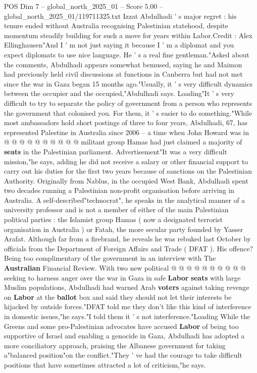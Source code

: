 \begin{textsample}{POS Dim 7 – global\_north\_2025\_01 – Score 5.00 – global\_north\_2025\_01/119711325.txt}  \label{ex:f7_pos_274}
Izzat Abdulhadi ' s major regret : his tenure ended without Australia recognising Palestinian statehood, despite momentum steadily building for such a move for years within Labor.Credit : Alex Ellinghausen"And I ' m not just saying it because I ' m a diplomat and you expect diplomats to use nice language.
He ' s a real fine gentleman."Asked about the comments, Abdulhadi appears somewhat bemused, saying he and Maimon had previously held civil discussions at functions in Canberra but had not met since the war in Gaza began 15 months ago."Usually, it ' s very difficult dynamics between the occupier and the occupied,"Abdulhadi says.
Loading"It ' s very difficult to try to separate the policy of government from a person who represents the government that colonised you.
For them, it ' s easier to do something."While most ambassadors hold short postings of three to four years, Abdulhadi, 67, has represented Palestine in Australia since 2006 -- a time when John Howard was in @ @ @ @ @ @ @ @ @ @ militant group Hamas had just claimed a majority of \textbf{seats} in the Palestinian parliament.
Advertisement"It was a very difficult mission,"he says, adding he did not receive a salary or other financial support to carry out his duties for the first two years because of sanctions on the Palestinian Authority.
Originally from Nablus, in the occupied West Bank, Abdulhadi spent two decades running a Palestinian non-profit organisation before arriving in Australia.
A self-described"technocrat", he speaks in the analytical manner of a university professor and is not a member of either of the main Palestinian political parties : the Islamist group Hamas ( now a designated terrorist organisation in Australia ) or Fatah, the more secular party founded by Yasser Arafat.
Although far from a firebrand, he reveals he was rebuked last October by officials from the Department of Foreign Affairs and Trade ( DFAT ).
His offence?
Being too complimentary of the government in an interview with The \textbf{Australian} Financial Review.
With two new political @ @ @ @ @ @ @ @ @ @ seeking to harness anger over the war in Gaza in safe \textbf{Labor} \textbf{seats} with large Muslim populations, Abdulhadi had warned Arab \textbf{voters} against taking revenge on \textbf{Labor} at the \textbf{ballot} box and said they should not let their interests be hijacked by outside forces."DFAT told me they don't like this kind of interference in domestic issues,"he says."I told them it ' s not interference."Loading While the Greens and some pro-Palestinian advocates have accused \textbf{Labor} of being too supportive of Israel and enabling a genocide in Gaza, Abdulhadi has adopted a more conciliatory approach, praising the Albanese government for taking a"balanced position"on the conflict."They ' ve had the courage to take difficult positions that have sometimes attracted a lot of criticism,"he says.

\end{textsample}
